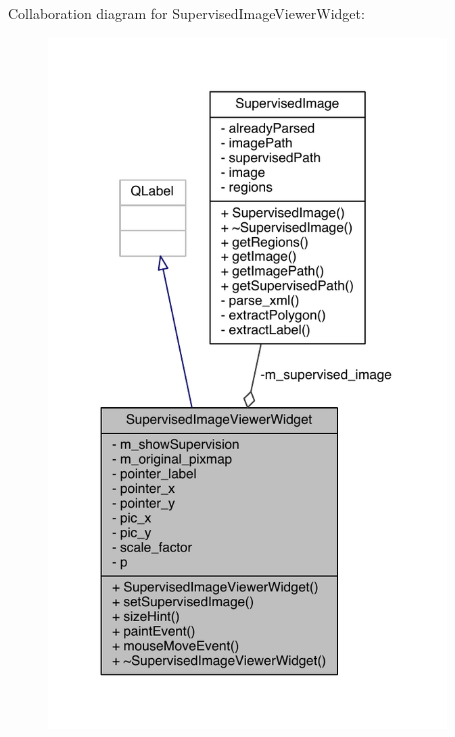 Collaboration diagram for Supervised\+Image\+Viewer\+Widget\+:\nopagebreak
\begin{figure}[H]
\begin{center}
\leavevmode
\includegraphics[width=299pt]{class_supervised_image_viewer_widget__coll__graph}
\end{center}
\end{figure}


